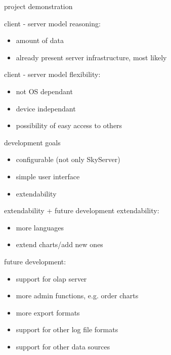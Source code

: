 \documentclass[xcolor=dvipsnames]{beamer}
\begin{document}
\begin{frame}{}
	\begin{center}
	\huge{project demonstration}
	\end{center}
\end{frame}  

\begin{frame}{client - server model}
	reasoning:
	\begin{itemize}
	  \item<2-> amount of data
	  \item<3-> already present server infrastructure, most likely
	\end{itemize}
\end{frame}

\begin{frame}{client - server model}
	flexibility:
	\begin{itemize}
	  \item<2-> not OS dependant
	  \item<3-> device independant %
	  \item<4-> possibility of easy access to others
	\end{itemize}
\end{frame}

\begin{frame}{development goals}
	\begin{itemize}
	  \item<1-> configurable (not only SkyServer)
	  \item<2-> simple user interface
	  \item<3-> extendability
	\end{itemize}
\end{frame}

\begin{frame}{extendability + future development}
	extendability:
	\begin{itemize}
	  \item<2-> more languages
	  \item<3-> extend charts/add new ones
	\end{itemize}
	 {future development:}
	\begin{itemize}
	  \item<5-> support for olap server
	  \item<6-> more admin functions, e.g. order charts
	  \item<7-> more export formats
	  \item<8-> support for other log file formats
	  \item<9-> support for other data sources
	\end{itemize}
\end{frame}
\end{document}

